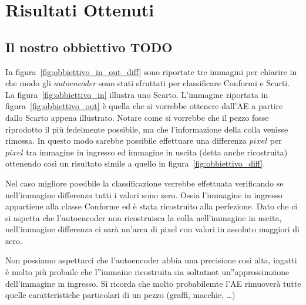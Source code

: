 
\chapter{Risultati Ottenuti}

\clearpage
\section{Il nostro obbiettivo TODO}
In figura~\ref{fig:obbiettivo_in_out_diff} sono riportate tre immagini per chiarire in che modo gli \textit{autoencoder} sono stati sfruttati per classificare Conformi e Scarti.
La figura~\ref{fig:obbiettivo_in} illustra uno Scarto.
L'immagine riportata in figura~\ref{fig:obbiettivo_out} è quella che si vorrebbe ottenere dall'AE a partire dallo Scarto appena illustrato.
Notare come si vorrebbe che il pezzo fosse riprodotto il più fedelmente possibile, ma che l'informazione della colla venisse rimossa.
In questo modo sarebbe possibile effettuare una differenza $pixel$ per $pixel$ tra immagine in ingresso ed immagine in uscita (detta anche ricostruita) ottenendo così un risultato simile a quello in figura~\ref{fig:obbiettivo_diff}.

Nel caso migliore possibile la classificazione verrebbe effettuata verificando se nell'immagine differenza tutti i valori sono zero.
Ossia l'immagine in ingresso appartiene alla classe Conforme ed è stata ricostruito alla perfezione.
Dato che ci si aspetta che l'autoencoder non ricostruisca la colla nell'immagine in uscita, nell'immagine differenza ci sarà un'area di pixel con valori in assoluto maggiori di zero.

Non possiamo aspettarci che l'autoencoder abbia una precisione così alta, ingatti è molto più probaile che l''immaine ricostruita sia soltatnot un''approssimzione dell'immagine in ingresso. 
Si ricorda che molto probabilemte l'AE rimuoverà tutte quelle caratteristiche particolari di un pezzo (graffi, macchie, \dots )




